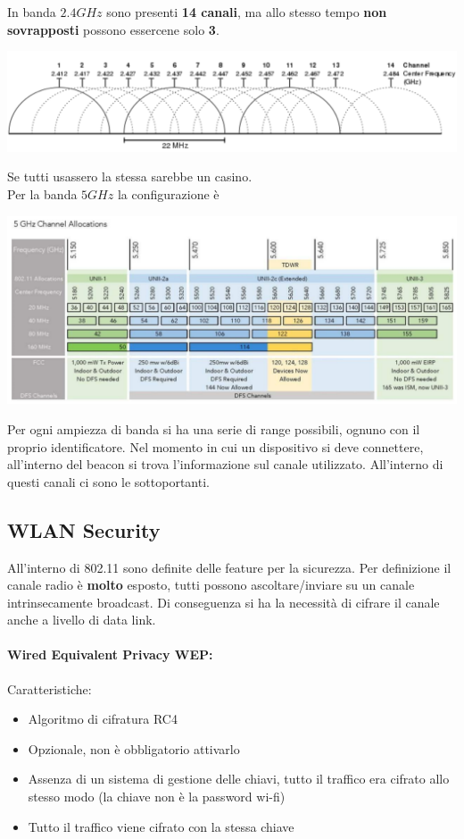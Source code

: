 
\newpage

In banda $2.4GHz$ sono presenti \textbf{14 canali}, ma allo stesso tempo \textbf{non sovrapposti} possono essercene solo \textbf{3}.
\begin{center}
	\includegraphics[width=0.95\linewidth]{img/wlan/24bande}
\end{center}
Se tutti usassero la stessa sarebbe un casino.\\

Per la banda $5GHz$ la configurazione è 
\begin{center}
	\includegraphics[width=0.95\linewidth]{img/wlan/5bande}
\end{center}
Per ogni ampiezza di banda si ha una serie di range possibili, ognuno con il proprio identificatore. Nel momento in cui un dispositivo si deve connettere, all'interno del beacon si trova l'informazione sul canale utilizzato. All'interno di questi canali ci sono le sottoportanti.\\

\newpage

\subsection{WLAN Security}
All'interno di 802.11 sono definite delle feature per la sicurezza. Per definizione il canale radio è \textbf{molto} esposto, tutti possono ascoltare/inviare su un canale intrinsecamente broadcast. Di conseguenza si ha la necessità di cifrare il canale anche a livello di data link.\\

\paragraph{Wired Equivalent Privacy WEP:} Caratteristiche:
\begin{itemize}
	\item Algoritmo di cifratura RC4
	\item Opzionale, non è obbligatorio attivarlo
	\item Assenza di un sistema di gestione delle chiavi, tutto il traffico era cifrato allo stesso modo (la chiave non è la password wi-fi)
	\item Tutto il traffico viene cifrato con la stessa chiave
\end{itemize}

